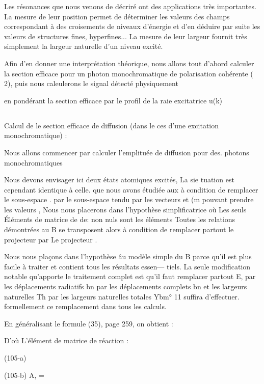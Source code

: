 Les résonances que nous venons de décriré ont des applications
très importantes. La mesure de leur position permet de déterminer les valeurs
des champs correspondant à des croisements de niveaux d'énergie et d'en déduire par suite les valeurs de structures fines, hyperfines... La mesure de leur
largeur fournit très simplement la largeur naturelle d'un niveau excité.

Afin d'en donner une interprétation théorique, nous allons tout
d'abord calculer la section efficace pour un photon monochromatique de polarisation cohérente ( 2), puis nous caleulerons le signal détecté physiquement

en pondérant la section efficace par le profil de la raie excitatrice u(k)

\subsection{} Calcul de le section efficace de diffusion (dans le ces d'une excitation monochromatique) :%



Nous allons commencer par calculer l'emplituée de diffusion
pour des. photons monochromatiques

Nous devons envisager ici deux états atomiques excités, La sie
tuation est cependant identique à celle. que nous avons étudiée aux 
à condition de remplacer le sous-espace . par le sous-espace 
tendu par les vecteurs et (m pouvant prendre les valeurs
, Nous nous placerons dans l'hypothèse simplificatrice où Les seuls
Éléments de matrice de de: non nuls sont les éléments 
Toutes les relations démontrées au  B se transposent alors à condition de
remplacer partout le projecteur  par Le projecteur
.

Nous nous plaçons dans l'hypothèse âu modèle simple du  B
parce qu'il est plus facile à traiter et contient tous les résultats essen—
tiels. La seule modification notable qu'apporte le traitement complet est qu'il
faut remplacer partout E, par  les déplacements radiatifs bn par les
déplacements complets bn et les largeurs naturelles Th par les largeurs naturelles totales Ybm° 11 suffira d'effectuer. formellement ce remplacement dans
tous les calculs.

En généralisant le formule (35), page 259, on obtient :

D'où L'élément de matrice de réaction :

(105-a)


(105-b) A, =

